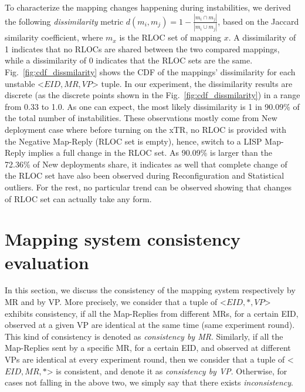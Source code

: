 To characterize the mapping changes happening during instabilities, we derived the following \emph{dissimilarity} metric $d(m_i,m_j) = 1 - \frac{ \left|m_i \cap m_j\right|}{\left|m_i \cup m_j\right|}$, based on the Jaccard similarity coefficient, where $m_x$ is the RLOC set of mapping $x$. A dissimilarity of 1 indicates that no RLOCs are shared between the two compared mappings, while a dissimilarity of 0 indicates that the RLOC sets are the same. Fig.~\ref{fig:cdf_dissmilarity} shows the CDF of the mappings' dissimilarity for each unstable <$EID, MR, VP$> tuple. In our experiment, the dissimilarity results are discrete (as the discrete points shown in the Fig.~\ref{fig:cdf_dissmilarity}) in a range from 0.33 to 1.0. As one can expect, the most likely dissimilarity is 1 in 90.09\% of the total number of instabilities. These observations mostly come from New deployment case where before turning on the xTR, no RLOC is provided with the Negative Map-Reply (RLOC set is empty), hence, switch to a LISP Map-Reply implies a full change in the RLOC set. As 90.09\% is larger than the 72.36\% of New deployments share, it indicates as well that complete change of the RLOC set have also been observed during Reconfiguration and Statistical outliers. For the rest, no particular trend can be observed showing that changes of RLOC set can actually take any form.


\section{Mapping system consistency evaluation}
\label{sec:mds_consistency}

In this section, we discuss the consistency of the mapping system respectively by MR and by VP. More precisely, we consider that a tuple of <$EID, *, VP$> exhibits consistency, if all the Map-Replies from different MRs, for a certain EID, observed at a given VP are identical at the same time (same experiment round). This kind of consistency is denoted as \emph{consistency by MR}. Similarly, if all the Map-Replies sent by a specific MR, for a certain EID, and observed at different VPs are identical at every experiment round, then we consider that a tuple of <$EID, MR, * $> is consistent, and denote it as \emph{consistency by VP}. Otherwise, for cases not falling in the above two, we simply say that there exists \emph{inconsistency}. 

